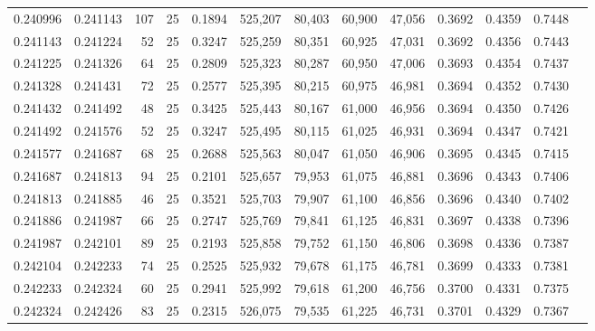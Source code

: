 \begin{tabular}{rrrrrrrrrrrrr}
0.240996 & 0.241143 &   107 &  25 &                                     0.1894 & 525,207 &  80,403 &  60,900 &  47,056 & 0.3692 & 0.4359 & 0.7448 \\
0.241143 & 0.241224 &    52 &  25 &                                     0.3247 & 525,259 &  80,351 &  60,925 &  47,031 & 0.3692 & 0.4356 & 0.7443 \\
0.241225 & 0.241326 &    64 &  25 &                                     0.2809 & 525,323 &  80,287 &  60,950 &  47,006 & 0.3693 & 0.4354 & 0.7437 \\
0.241328 & 0.241431 &    72 &  25 &                                     0.2577 & 525,395 &  80,215 &  60,975 &  46,981 & 0.3694 & 0.4352 & 0.7430 \\
0.241432 & 0.241492 &    48 &  25 &                                     0.3425 & 525,443 &  80,167 &  61,000 &  46,956 & 0.3694 & 0.4350 & 0.7426 \\
0.241492 & 0.241576 &    52 &  25 &                                     0.3247 & 525,495 &  80,115 &  61,025 &  46,931 & 0.3694 & 0.4347 & 0.7421 \\
0.241577 & 0.241687 &    68 &  25 &                                     0.2688 & 525,563 &  80,047 &  61,050 &  46,906 & 0.3695 & 0.4345 & 0.7415 \\
0.241687 & 0.241813 &    94 &  25 &                                     0.2101 & 525,657 &  79,953 &  61,075 &  46,881 & 0.3696 & 0.4343 & 0.7406 \\
0.241813 & 0.241885 &    46 &  25 &                                     0.3521 & 525,703 &  79,907 &  61,100 &  46,856 & 0.3696 & 0.4340 & 0.7402 \\
0.241886 & 0.241987 &    66 &  25 &                                     0.2747 & 525,769 &  79,841 &  61,125 &  46,831 & 0.3697 & 0.4338 & 0.7396 \\
0.241987 & 0.242101 &    89 &  25 &                                     0.2193 & 525,858 &  79,752 &  61,150 &  46,806 & 0.3698 & 0.4336 & 0.7387 \\
0.242104 & 0.242233 &    74 &  25 &                                     0.2525 & 525,932 &  79,678 &  61,175 &  46,781 & 0.3699 & 0.4333 & 0.7381 \\
0.242233 & 0.242324 &    60 &  25 &                                     0.2941 & 525,992 &  79,618 &  61,200 &  46,756 & 0.3700 & 0.4331 & 0.7375 \\
0.242324 & 0.242426 &    83 &  25 &                                     0.2315 & 526,075 &  79,535 &  61,225 &  46,731 & 0.3701 & 0.4329 & 0.7367 \\

\end{tabular}
